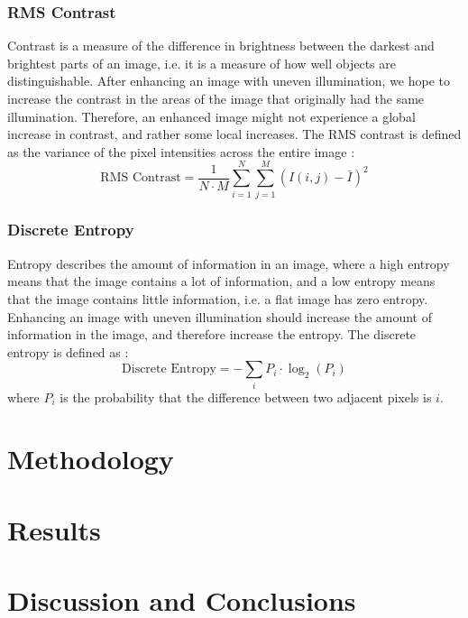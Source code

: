 \documentclass[sigconf]{acmart}
\begin{document}
\subsubsection{RMS Contrast}\label{sec:rms-contrast}
Contrast is a measure of the difference in brightness between the darkest and brightest parts of an image, i.e. it is a measure of how well objects are distinguishable. After enhancing an image with uneven illumination, we hope to increase the contrast in the areas of the image that originally had the same illumination. Therefore, an enhanced image might not experience a global increase in contrast, and rather some local increases. The RMS contrast is defined as the variance of the pixel intensities across the entire image \cite{dey2019uneven}:
\begin{equation}
	\text{RMS Contrast} = \frac{1}{N \cdot M} \sum_{i=1}^{N} \sum_{j=1}^{M} (I(i,j) - \bar{I})^2
\end{equation}

\subsubsection{Discrete Entropy}\label{sec:discrete-entropy}
Entropy describes the amount of information in an image, where a high entropy means that the image contains a lot of information, and a low entropy means that the image contains little information, i.e. a flat image has zero entropy. Enhancing an image with uneven illumination should increase the amount of information in the image, and therefore increase the entropy. The discrete entropy is defined as \cite{dey2019uneven,ye2007discrete}:
\begin{equation}
	\text{Discrete Entropy} = - \sum_{i} P_i \cdot \log_2(P_i)
\end{equation}
where $P_i$ is the probability that the difference between two adjacent pixels is $i$.


\section{Methodology}\label{sec:method}


\section{Results}\label{sec:results}


\section{Discussion and Conclusions}
\end{document}
